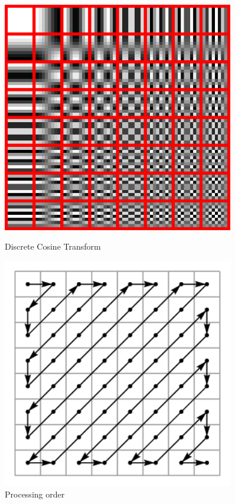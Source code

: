 \documentclass[11pt]{article}
\begin{document}
\begin{figure}
  \centering
  \begin{minipage}{0.45\textwidth}
      \centering
      \includegraphics[width=0.9\textwidth]{./images/dct.png}
      \caption{Discrete Cosine Transform}
      \label{fig:dct}
  \end{minipage}\hfill
  \begin{minipage}{0.45\textwidth}
      \centering
      \includegraphics[width=0.9\textwidth]{./images/dct_order.png}
      \caption{Processing order}
      \label{fig:dct_order}
  \end{minipage}
\end{figure}
\end{document}
